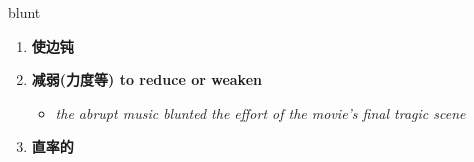 
\begin{frame}
{\huge blunt}
\begin{center}
\begin{enumerate}\Large
  \item \textbf{使边钝}
  \item \textbf{减弱(力度等) to reduce or weaken}
  \begin{itemize}
    \item \em{\Large{the abrupt music blunted the effort of the movie's final tragic scene}}
  \end{itemize}
  \item \textbf{直率的}
\end{enumerate}
\end{center}
\end{frame}
